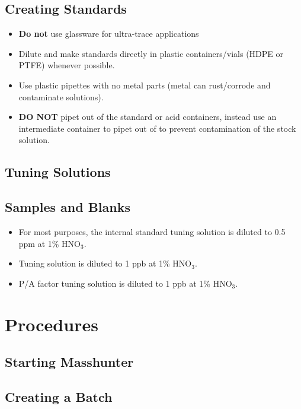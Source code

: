 \documentclass[12pt]{../SOP4_alpha}\usepackage[]{graphicx}\usepackage[]{color}
\begin{document}
\subsection{Creating Standards}

\begin{itemize}
  \item \textbf{Do not} use glassware for ultra-trace applications
  \item Dilute and make standards directly in plastic containers/vials (HDPE or PTFE) whenever possible.
  \item Use plastic pipettes with no metal parts (metal can rust/corrode and contaminate solutions).
  \item \textbf{DO NOT} pipet out of the standard or acid containers, instead use an intermediate container to pipet out of to prevent contamination of the stock solution.
\end{itemize}

\subsection{Tuning Solutions}

\subsection{Samples and Blanks}

\begin{itemize}
  \item For most purposes, the internal standard tuning solution is diluted to 0.5 ppm at 1\% HNO$_3$.
  \item Tuning solution is diluted to 1 ppb at 1\% HNO$_3$.
  \item P/A factor tuning solution is diluted to 1 ppb at 1\% HNO$_3$.
\end{itemize}

\section{Procedures}

\subsection{Starting Masshunter}

\subsection{Creating a Batch}
\end{document}
